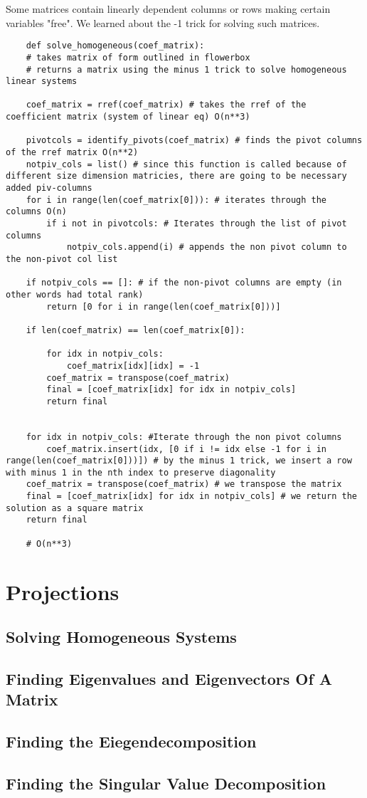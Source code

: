 \documentclass[12pt, a4paper]{article}
\begin{document}
Some matrices contain linearly dependent columns or rows making certain variables "free". We learned about the -1 trick for solving such matrices.
\begin{lstlisting}
    def solve_homogeneous(coef_matrix):
    # takes matrix of form outlined in flowerbox
    # returns a matrix using the minus 1 trick to solve homogeneous linear systems

    coef_matrix = rref(coef_matrix) # takes the rref of the coefficient matrix (system of linear eq) O(n**3)

    pivotcols = identify_pivots(coef_matrix) # finds the pivot columns of the rref matrix O(n**2)
    notpiv_cols = list() # since this function is called because of different size dimension matricies, there are going to be necessary added piv-columns
    for i in range(len(coef_matrix[0])): # iterates through the columns O(n)
        if i not in pivotcols: # Iterates through the list of pivot columns
            notpiv_cols.append(i) # appends the non pivot column to the non-pivot col list
    
    if notpiv_cols == []: # if the non-pivot columns are empty (in other words had total rank)
        return [0 for i in range(len(coef_matrix[0]))]

    if len(coef_matrix) == len(coef_matrix[0]):

        for idx in notpiv_cols:
            coef_matrix[idx][idx] = -1
        coef_matrix = transpose(coef_matrix)
        final = [coef_matrix[idx] for idx in notpiv_cols]
        return final


    for idx in notpiv_cols: #Iterate through the non pivot columns
        coef_matrix.insert(idx, [0 if i != idx else -1 for i in range(len(coef_matrix[0]))]) # by the minus 1 trick, we insert a row with minus 1 in the nth index to preserve diagonality
    coef_matrix = transpose(coef_matrix) # we transpose the matrix
    final = [coef_matrix[idx] for idx in notpiv_cols] # we return the solution as a square matrix  
    return final

    # O(n**3)
\end{lstlisting}


\section{Projections}

\subsection{Solving Homogeneous Systems}

\subsection{Finding Eigenvalues and Eigenvectors Of A Matrix}

\subsection{Finding the Eiegendecomposition}

\subsection{Finding the Singular Value Decomposition}
\end{document}
